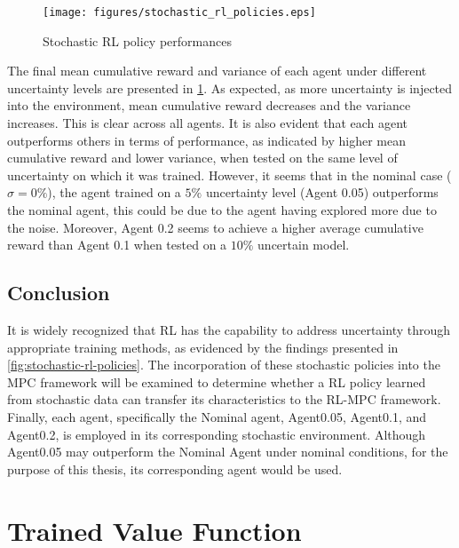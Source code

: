 \begin{figure}[H]
    \centering
    \texttt{[image: figures/stochastic\_rl\_policies.eps]}
    \caption{Stochastic RL policy performances}
    \label{fig:stochastic-rl-policies}
\end{figure}

The final mean cumulative reward and variance of each agent under different uncertainty levels are presented in \ref{fig:stochastic-rl-policies}. As expected, as more uncertainty is injected into the environment, mean cumulative reward decreases and the variance increases. This is clear across all agents. It is also evident that each agent outperforms others in terms of performance, as indicated by higher mean cumulative reward and lower variance,  when tested on the same level of uncertainty on which it was trained. However, it seems that in the nominal case ($\sigma = 0\%$), the agent trained on a $5\%$ uncertainty level (Agent 0.05) outperforms the nominal agent, this could be due to the agent having explored more due to the noise. Moreover, Agent 0.2 seems to achieve a higher average cumulative reward than Agent 0.1 when tested on a $10\%$ uncertain model.

\subsection{Conclusion}
It is widely recognized that RL has the capability to address uncertainty through appropriate training methods, as evidenced by the findings presented in \autoref{fig:stochastic-rl-policies}. The incorporation of these stochastic policies into the MPC framework will be examined to determine whether a RL policy learned from stochastic data can transfer its characteristics to the RL-MPC framework. Finally, each agent, specifically the Nominal agent, Agent0.05, Agent0.1, and Agent0.2, is employed in its corresponding stochastic environment. Although Agent0.05 may outperform the Nominal Agent under nominal conditions, for the purpose of this thesis, its corresponding agent would be used.

\section{Trained Value Function}
\label{section:trained-vf}

